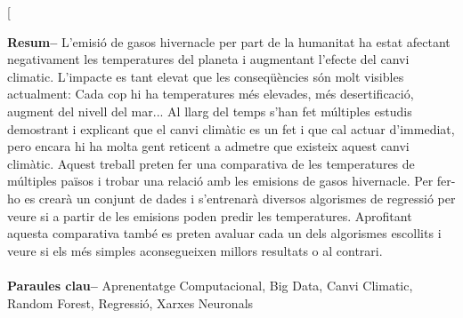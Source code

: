 \documentclass[10pt,a4paper,twocolumn,twoside]{article}
\begin{document}
\twocolumn[\begin{@twocolumnfalse}


\maketitle

\thispagestyle{primerapagina}
\begin{center}
\parbox{0.915\textwidth}
{\sffamily
\textbf{Resum--}
L'emisió de gasos hivernacle per part de la humanitat ha estat afectant negativament les temperatures del planeta i augmentant l'efecte del canvi climatic. L'impacte es tant elevat que les conseqüències són molt visibles actualment: Cada cop hi ha temperatures més elevades, més desertificació, augment del nivell del mar... Al llarg del temps s'han fet múltiples estudis demostrant i explicant que el canvi climàtic es un fet i que cal actuar d'immediat, pero encara hi ha molta gent reticent a admetre que existeix aquest canvi climàtic. Aquest treball preten fer una comparativa de les temperatures de múltiples països i trobar una relació amb les emisions de gasos hivernacle. Per fer-ho es crearà un conjunt de dades i s'entrenarà diversos algorismes de regressió per veure si a partir de les emisions poden predir les temperatures. Aprofitant aquesta comparativa també es preten avaluar cada un dels algorismes escollits i veure si els més simples aconsegueixen millors resultats o al contrari.
\\
\\
\textbf{Paraules clau-- } Aprenentatge Computacional, Big Data, Canvi Climatic, Random Forest,  Regressió, Xarxes Neuronals \\
\\
\bigskip
\\
}
\end{center}
\end{@twocolumnfalse}
\end{document}

